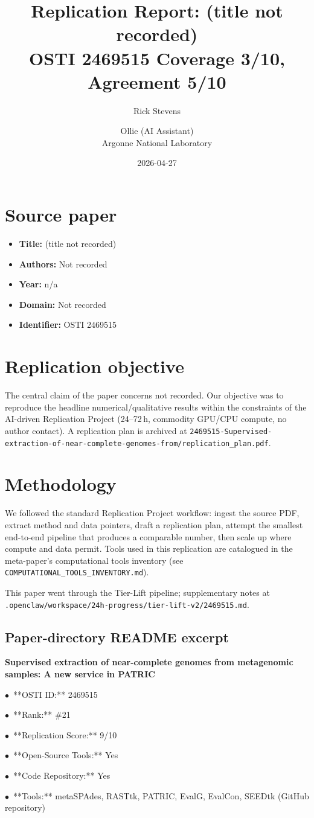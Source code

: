 \documentclass[11pt]{article}
\title{Replication Report: (title not recorded)\\[2pt]\large OSTI 2469515 \textbar{} Coverage 3/10, Agreement 5/10}
\author{Rick Stevens \and Ollie (AI Assistant)\\\small Argonne National Laboratory}
\date{2026-04-27}
\begin{document}
\maketitle

\section{Source paper}
\begin{itemize}
\item \textbf{Title:} (title not recorded)
\item \textbf{Authors:} Not recorded
\item \textbf{Year:} n/a
\item \textbf{Domain:} Not recorded
\item \textbf{Identifier:} OSTI 2469515
\end{itemize}


\section{Replication objective}
The central claim of the paper concerns not recorded. Our objective was to reproduce the headline numerical/qualitative results within the constraints of the AI-driven Replication Project (24--72\,h, commodity GPU/CPU compute, no author contact). A replication plan is archived at \texttt{2469515-Supervised-extraction-of-near-complete-genomes-from/replication\_plan.pdf}.

\section{Methodology}
We followed the standard Replication Project workflow: ingest the source PDF, extract method and data pointers, draft a replication plan, attempt the smallest end-to-end pipeline that produces a comparable number, then scale up where compute and data permit. Tools used in this replication are catalogued in the meta-paper's computational tools inventory (see \texttt{COMPUTATIONAL\_TOOLS\_INVENTORY.md}).

This paper went through the Tier-Lift pipeline; supplementary notes at \texttt{.openclaw/workspace/24h-progress/tier-lift-v2/2469515.md}.

\subsection*{Paper-directory README excerpt}
\small
\par\medskip\textbf{Supervised extraction of near-complete genomes from metagenomic samples: A new service in PATRIC}\par
\par$\bullet$\ **OSTI ID:** 2469515
\par$\bullet$\ **Rank:** \#21
\par$\bullet$\ **Replication Score:** 9/10
\par$\bullet$\ **Open-Source Tools:** Yes
\par$\bullet$\ **Code Repository:** Yes
\par$\bullet$\ **Tools:** metaSPAdes, RASTtk, PATRIC, EvalG, EvalCon, SEEDtk (GitHub repository)
\end{document}

